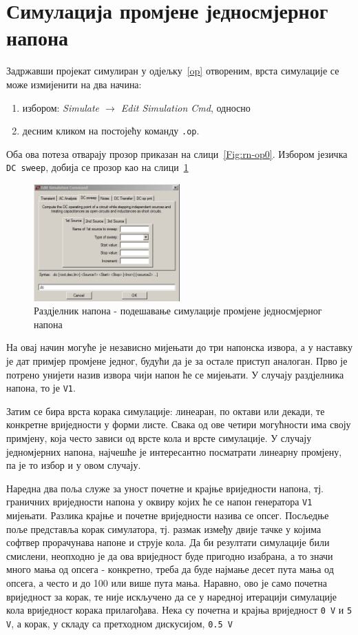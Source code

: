 \section{Симулација промјене једносмјерног напона}
\label{dc}

Задржавши пројекат симулиран у одјељку~\ref{op} отвореним, врста симулације се може измијенити на два начина:
\begin{enumerate}
\item избором: \textit{Simulate $\rightarrow$ Edit Simulation Cmd}, односно
\item десним кликом на постојећу команду \texttt{.op}.
\end{enumerate}
Оба ова потеза отварају прозор приказан на слици~\ref{Fig:rn-op0}. Избором језичка \texttt{DC sweep}, добија се прозор као на слици~\ref{Fig:rn-dc0}

\begin{figure}[h]
\centering
\includegraphics[width=0.5\textwidth]{figs/rn-dc0.PNG}
\caption{Раздјелник напона - подешавање симулације промјене једносмјерног напона}
\label{Fig:rn-dc0}
\end{figure}

На овај начин могуће је независно мијењати до три напонска извора, а у наставку је дат примјер промјене једног, будући да је за остале приступ аналоган. Прво је потрено унијети назив извора чији напон ће се мијењати. У случају раздјелника напона, то је \texttt{V1}. 

Затим се бира врста корака симулације: линеаран, по октави или декади, те конкретне вриједности у форми листе. Свака од ове четири могућности има своју примјену, која често зависи од врсте кола и врсте симулације. У случају једномјерних напона, најчешће је интересантно посматрати линеарну промјену, па је то избор и у овом случају.

Наредна два поља служе за уност почетне и крајње вриједности напона, тј. граничних вриједности напона у оквиру којих ће се напон генератора \texttt{V1} мијењати. Разлика крајње и почетне вриједности назива се опсег. Посљедње поље представља корак симулатора, тј. размак између двије тачке у којима софтвер прорачунава напоне и струје кола. Да би резултати симулације били смислени, неопходно је да ова вриједност буде пригодно изабрана, а то значи много мања од опсега - конкретно, треба да буде најмање десет пута мања од опсега, а често и до 100 или више пута мања. Наравно, ово је само почетна вриједност за корак, те није искључено да се у наредној итерацији симулације кола вриједност корака прилагођава. Нека су почетна и крајња вриједност \texttt{0 V} и \texttt{5 V}, а корак, у складу са претходном дискусијом, \texttt{0.5 V}

